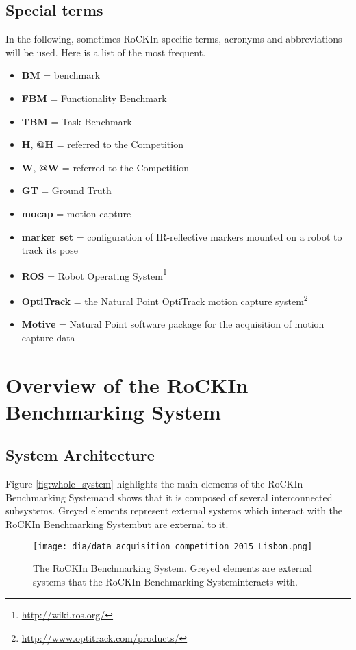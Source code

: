 \documentclass[a4paper]{article}
\newcommand{\ro}{RoCKIn}
\newcommand{\rbs}{RoCKIn Benchmarking System}
\begin{document}
\subsection{Special terms}
In the following, sometimes \ro-specific terms, acronyms and abbreviations will be used. Here is a list of the most frequent.
\begin{itemize}
\item \textbf{BM} = benchmark
\item \textbf{FBM} = Functionality Benchmark
\item \textbf{TBM} = Task Benchmark
\item \textbf{H}, \textbf{@H} = referred to the \ro@Home Competition
\item \textbf{W}, \textbf{@W} = referred to the \ro@Work Competition
\item \textbf{GT} = Ground Truth
\item \textbf{mocap} = motion capture
\item \textbf{marker set} = configuration of IR-reflective markers mounted on a robot to track its pose
\item \textbf{ROS} = Robot Operating System\footnote{\url{http://wiki.ros.org/}}
\item \textbf{OptiTrack} = the Natural Point OptiTrack motion capture system\footnote{\url{http://www.optitrack.com/products/}}
\item \textbf{Motive} = Natural Point software package for the acquisition of motion capture data
\end{itemize}

\clearpage


\section{Overview of the \rbs}
\label{sec:overview}

\subsection{System Architecture}
Figure \ref{fig:whole_system} highlights the main elements of the \rbs and shows that it is composed of several interconnected subsystems. Greyed elements represent external systems which interact with the \rbs but are external to it.

\begin{figure}[h]
  \centering
  \texttt{[image: dia/data\_acquisition\_competition\_2015\_Lisbon.png]}
  \caption{The \rbs. Greyed elements are external systems that the \rbs interacts with.}
\end{figure}
\label{fig:whole_system}
\end{document}
